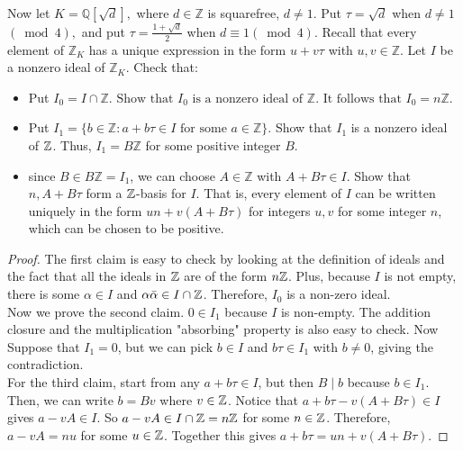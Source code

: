 \documentclass[12pt,twoside=semi,openright,numbers=noenddot]{scrbook}
\begin{document}
\begin{problem}
    Now let $K=\mathbb{Q}[\sqrt{d}],$ where $d \in \mathbb{Z}$ is squarefree, $d \neq 1 .$ Put $\tau=\sqrt{d}$ when $d \neq 1$ $(\bmod 4),$ and put 
    $\tau=\frac{1+\sqrt{d}}{2}$ when $d \equiv 1(\bmod 4)$. Recall that every element of $\mathbb{Z}_{K}$ has a unique expression in the form $u+v \tau$ with $u, v \in \mathbb{Z}$.
    Let $I$ be a nonzero ideal of $\mathbb{Z}_{K}$. Check that:
    \begin{itemize}
        \item Put $I_{0}=I \cap \mathbb{Z} . \text { Show that } I_0 \text { is a nonzero ideal of } \mathbb{Z} . \text { It follows that } I_{0}=n \mathbb{Z}$.
        \item Put $I_{1}=\{b \in \mathbb{Z}: a+b \tau \in I \text { for some } a \in \mathbb{Z}\}$. Show that $I_{1}$ is a nonzero ideal of $\mathbb Z$. Thus, $I_{1}=B \mathbb{Z}$ for some positive integer $B$.
        \item since $B \in B \mathbb{Z}=I_{1}$, we can choose $A \in \mathbb{Z}$ with $A+B \tau \in I$. Show that $n, A+B \tau$ form a $\mathbb Z$-basis for $I$. 
            That is, every element of $I$ can be written uniquely in the form $u n+v(A+B \tau)$ for integers $u, v$ 
            for some integer $n$, which can be chosen to be positive.
    \end{itemize}
\end{problem}
    \begin{proof}
        The first claim is easy to check by looking at the definition of ideals and the fact that all the ideals in $\mathbb Z$ are of the form $n\mathbb Z$. Plus, because $I$ is not empty, 
        there is some $\alpha \in I$ and $\alpha\bar{\alpha}\in I \cap \mathbb Z$. Therefore, $I_0$ is a non-zero ideal.\\
        \newline
        Now we prove the second claim. $0 \in I_1$ because $I$ is non-empty. The addition closure and the multiplication "absorbing" property is also easy to check. 
        Now Suppose that $I_1 = {0}$, but we can pick $b \in I$ and $b\tau \in I_1$ with $b \neq 0$, giving the contradiction.\\
        \newline
        For the third claim, start from any $a+b\tau \in I$, but then $B \mid b$ because $b \in I_1$. Then, we can write $b = Bv$ where $v \in \mathbb Z$. Notice that 
        $a+b\tau - v(A+B\tau) \in I$ gives $a-vA \in I$. So $a-vA \in I \cap \mathbb Z = n\mathbb Z$ for some $n \in \mathbb Z$. Therefore, $a-vA = nu$ for some $u \in \mathbb Z$.  
        Together this gives $a+b\tau = un+v(A+B\tau)$. 
    \end{proof}
\end{document}
